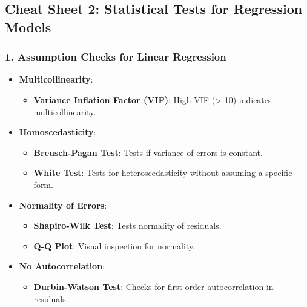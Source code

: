 \documentclass[
]{article}
\providecommand{\tightlist}{%
  \setlength{\itemsep}{0pt}\setlength{\parskip}{0pt}}\usepackage{longtable,booktabs,array}
\begin{document}
\subsection{\texorpdfstring{\textbf{Cheat Sheet 2: Statistical Tests for
Regression
Models}}{Cheat Sheet 2: Statistical Tests for Regression Models}}\label{cheat-sheet-2-statistical-tests-for-regression-models}

\subsubsection{\texorpdfstring{\textbf{1. Assumption Checks for Linear
Regression}}{1. Assumption Checks for Linear Regression}}\label{assumption-checks-for-linear-regression}

\begin{itemize}
\tightlist
\item
  \textbf{Multicollinearity}:

  \begin{itemize}
  \tightlist
  \item
    \textbf{Variance Inflation Factor (VIF)}: High VIF (\textgreater{}
    10) indicates multicollinearity.
  \end{itemize}
\item
  \textbf{Homoscedasticity}:

  \begin{itemize}
  \tightlist
  \item
    \textbf{Breusch-Pagan Test}: Tests if variance of errors is
    constant.
  \item
    \textbf{White Test}: Tests for heteroscedasticity without assuming a
    specific form.
  \end{itemize}
\item
  \textbf{Normality of Errors}:

  \begin{itemize}
  \tightlist
  \item
    \textbf{Shapiro-Wilk Test}: Tests normality of residuals.
  \item
    \textbf{Q-Q Plot}: Visual inspection for normality.
  \end{itemize}
\item
  \textbf{No Autocorrelation}:

  \begin{itemize}
  \tightlist
  \item
    \textbf{Durbin-Watson Test}: Checks for first-order autocorrelation
    in residuals.
  \end{itemize}
\end{itemize}
\end{document}
